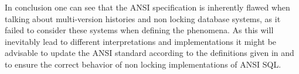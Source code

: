 \documentclass[sigconf, review=true]{acmart}
\begin{document}
In conclusion one can see that the ANSI specification is inherently flawed when talking
about multi-version histories and non locking database systems, as it failed to consider
these systems when defining the phenomena. As this will inevitably lead to different interpretations
and implementations it might be advisable to update the ANSI standard
according to the definitions given in \cite{Adya_Liskov_O_Neil_2000} and \cite{Berenson_Bernstein_Gray_Melton_O_Neil_O_Neil_1995}
to ensure the correct behavior of non locking implementations of ANSI SQL.


\end{document}
